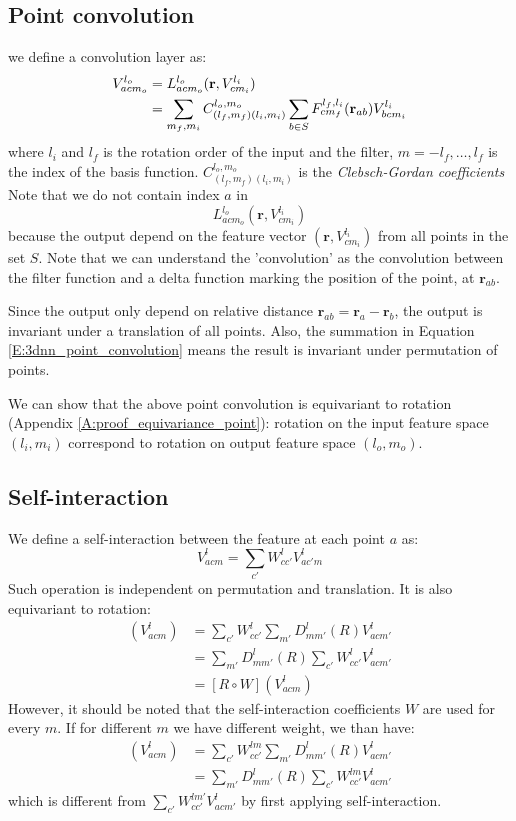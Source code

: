 \documentclass{article}
\begin{document}
\subsection*{Point convolution}
we define a convolution layer as:
\begin{align}
    V_{acm_o}^{l_o} &= L^{l_o}_{acm_o} (\mathbf{r}, V_{cm_i}^{l_i}) \notag\\
    &= \sum_{m_f, m_i} C^{l_o,m_o}_{(l_f, m_f)(l_i,m_i)} \sum_{b \in S} F_{cm_f}^{l_f, l_i}(\mathbf{r}_{ab}) V^{l_i}_{bcm_i} \label{E:3dnn_point_convolution}
\end{align}
where $l_i$ and $l_f$ is the rotation order of the input and the filter, $m = -l_f, \dots, l_f$ is the index of the basis function.
$C^{l_o,m_o}_{(l_f, m_f)(l_i,m_i)}$ is the \emph{Clebsch-Gordan coefficients}
Note that we do not contain index $a$ in \[L^{l_o}_{acm_o} (\mathbf{r}, V_{cm_i}^{l_i})\] because
the output depend on the feature vector $(\mathbf{r}, V_{cm_i}^{l_i})$ from all points in the set $S$.
Note that we can understand the 'convolution' as the convolution between the filter function and a delta function 
marking the position of the point, at $\mathbf{r}_{ab}$.

Since the output only depend on relative distance $\mathbf{r}_{ab} = \mathbf{r}_{a} - \mathbf{r}_{b} $, 
the output is invariant under a translation of all points. Also, the summation in Equation \eqref{E:3dnn_point_convolution}
means the result is invariant under permutation of points.

We can show that the above point convolution is equivariant to rotation (Appendix \ref{A:proof_equivariance_point}):
rotation on the input feature space $(l_i,m_i)$ 
correspond to rotation on output feature space $(l_o,m_o)$.

\subsection*{Self-interaction}
We define a self-interaction between the feature at each point $a$ as:
\begin{equation}
    V_{acm}^{l} = \sum_{c'} W^{l}_{cc'} V_{ac'm}^{l} 
\end{equation}
Such operation is independent on permutation and translation. It is also equivariant to rotation:
\begin{align*}
    [ W \circ R ] (V_{acm}^l) &= \sum_{c'} W^{l}_{cc'} \sum_{m'}D_{mm'}^l(R)V_{acm'}^l \\
                &= \sum_{m'}D_{mm'}^l(R) \sum_{c'} W^{l}_{cc'}  V_{acm'}^l \\
                &= [ R \circ W ] (V_{acm}^l)
\end{align*}
However, it should be noted that the self-interaction coefficients $W$ are used for every $m$. 
If for different $m$ we have different weight, we than have:
\begin{align*}
    [ W \circ R ] (V_{acm}^l) &= \sum_{c'} W^{lm}_{cc'} \sum_{m'}D_{mm'}^l(R)V_{acm'}^l \\
                &= \sum_{m'}D_{mm'}^l(R) \sum_{c'} W^{lm}_{cc'}  V_{acm'}^l 
\end{align*}
which is different from $\sum_{c'} W^{lm'}_{cc'}  V_{acm'}^l$ by first applying self-interaction.
\end{document}
